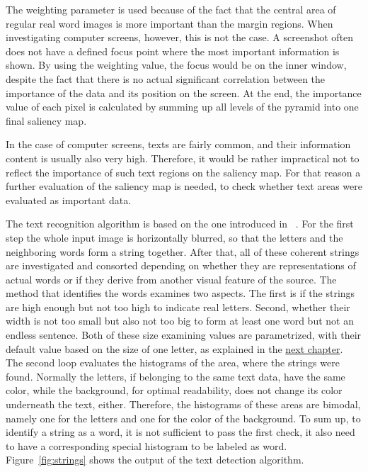 \documentclass[draft,final]{vutinfth} %
\begin{document}
	The weighting parameter is used because of the fact that the central area of regular real word images is more important than the margin regions.
	When investigating computer screens, however, this is not the case.
	A screenshot often does not have a defined focus point where the most important information is shown.
	By using the weighting value, the focus would be on the inner window, despite the fact that there is no actual significant correlation between the importance of the data and its position on the screen.
	At the end, the importance value of each pixel is calculated by summing up all levels of the pyramid into one final saliency map.\par
	In the case of computer screens, texts are fairly common, and their information content is usually also very high.
	Therefore, it would be rather impractical not to reflect the importance of such text regions on the saliency map. 
	For that reason a further evaluation of the saliency map is needed, to check whether text areas were evaluated as important data.\par 
	The text recognition algorithm is based on the one introduced in ~\cite{chang2011associating}.
	For the first step the whole input image is horizontally blurred, so that the letters and the neighboring words form a string together.
	After that, all of these coherent strings are investigated and consorted depending on whether they are representations of actual words or if they derive from another visual feature of the source.
	The method that identifies the words examines two aspects.
	The first is if the strings are high enough but not too high to indicate real letters.
	Second, whether their width is not too small but also not too big to form at least one word but not an endless sentence.
	Both of these size examining values are parametrized, with their default value based on the size of one letter, as explained in the \hyperref[Implementation]{next chapter}. 
	The second loop evaluates the histograms of the area, where the strings were found.
	Normally the letters, if belonging to the same text data, have the same color, while the background, for optimal readability, does not change its color underneath the text, either.
	Therefore, the histograms of these areas are bimodal, namely one for the letters and one for the color of the background.
	To sum up, to identify a string as a word, it is not sufficient to pass the first check, it  also need  to have a corresponding special histogram to be labeled as word. 
	Figure~\ref{fig:strings} shows the output of the text detection algorithm. 
\end{document}
